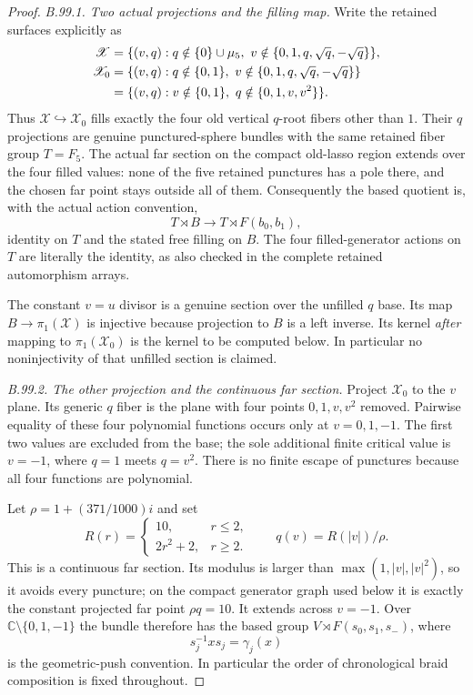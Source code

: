 \begin{proof}
\emph{B.99.1. Two actual projections and the filling map.}
Write the retained surfaces explicitly as
\begin{align}
 \mathscr X
  &=\{(v,q):q\notin\{0\}\cup\mu_5,
                 \ v\notin\{0,1,q,\sqrt q,-\sqrt q\}\},\notag\\
 \mathscr X_0
  &=\{(v,q):q\notin\{0,1\},
                 \ v\notin\{0,1,q,\sqrt q,-\sqrt q\}\}\notag\\
  &=\{(v,q):v\notin\{0,1\},\ q\notin\{0,1,v,v^2\}\}.
 \label{eq:B99-surfaces}
\end{align}
Thus $\mathscr X\hookrightarrow\mathscr X_0$ fills exactly the four
old vertical $q$-root fibers other than $1$.
Their $q$ projections are genuine punctured-sphere bundles with the
same retained fiber group $T=F_5$.
The actual far section on the compact old-lasso region extends over
the four filled values: none of the five retained punctures has a pole
there, and the chosen far point stays outside all of them.
Consequently the based quotient is, with the actual action convention,
\begin{equation}\label{eq:B99-q-bundles}
 T\rtimes B\longrightarrow T\rtimes F(b_0,b_1),
\end{equation}
identity on $T$ and the stated free filling on $B$.
The four filled-generator actions on $T$ are literally the identity,
as also checked in the complete retained automorphism arrays.

The constant $v=u$ divisor is a genuine section over the unfilled
$q$ base.  Its map $B\to\pi_1(\mathscr X)$ is injective because
projection to $B$ is a left inverse.
Its kernel \emph{after} mapping to $\pi_1(\mathscr X_0)$ is the
kernel to be computed below.  In particular no noninjectivity of
that unfilled section is claimed.

\emph{B.99.2. The other projection and the continuous far section.}
Project $\mathscr X_0$ to the $v$ plane.
Its generic $q$ fiber is the plane with four points
$0,1,v,v^2$ removed.
Pairwise equality of these four polynomial functions occurs only at
$v=0,1,-1$.  The first two values are excluded from the base;
the sole additional finite critical value is $v=-1$, where
$q=1$ meets $q=v^2$.
There is no finite escape of punctures because all four functions
are polynomial.

Let $\rho=1+(371/1000)i$ and set
\[
 R(r)=\begin{cases}10,&r\leq2,\\2r^2+2,&r\geq2.\end{cases}
 \qquad q(v)=R(|v|)/\rho.
\]
This is a continuous far section.  Its modulus is larger than
$\max(1,|v|,|v|^2)$, so it avoids every puncture; on the compact
generator graph used below it is exactly the constant projected
far point $\rho q=10$.
It extends across $v=-1$.
Over $\mathbb C\setminus\{0,1,-1\}$ the bundle therefore has the
based group $V\rtimes F(s_0,s_1,s_-)$, where
\[
 s_j^{-1}x s_j=\gamma_j(x)
\]
is the geometric-push convention.  In particular the order of
chronological braid composition is fixed throughout.


\end{proof}
